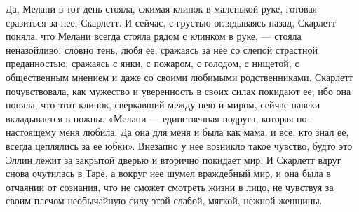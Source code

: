 Да, Мелани в тот день стояла, сжимая клинок в маленькой руке, готовая сразиться за нее, Скарлетт. И сейчас, с грустью оглядываясь назад, Скарлетт поняла, что Мелани всегда стояла рядом с клинком в руке, — стояла неназойливо, словно тень, любя ее, сражаясь за нее со слепой страстной преданностью, сражаясь с янки, с пожаром, с голодом, с нищетой, с общественным мнением и даже со своими любимыми родственниками.
Скарлетт почувствовала, как мужество и уверенность в своих силах покидают ее, ибо она поняла, что этот клинок, сверкавший между нею и миром, сейчас навеки вкладывается в ножны.
«Мелани — единственная подруга, которая по-настоящему меня любила. Да она для меня и была как мама, и все, кто знал ее, всегда цеплялись за ее юбки».
Внезапно у нее возникло такое чувство, будто это Эллин лежит за закрытой дверью и вторично покидает мир. И Скарлетт вдруг снова очутилась в Таре, а вокруг нее шумел враждебный мир, и она была в отчаянии от сознания, что не сможет смотреть жизни в лицо, не чувствуя за своим плечом необычайную силу этой слабой, мягкой, нежной женщины.




